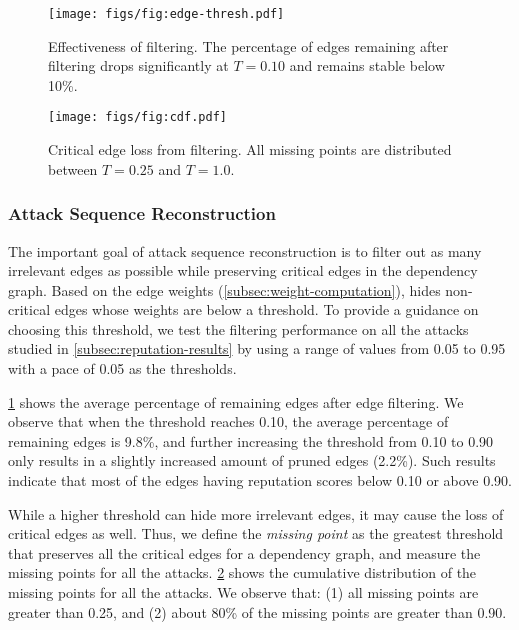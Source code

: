 


% 
\begin{figure}[!ht]
    \centering
    \texttt{[image: figs/fig:edge-thresh.pdf]}
    \caption{Effectiveness of filtering. The percentage of edges remaining after filtering drops significantly at $T = 0.10$ and remains stable below 10\%.}
    \label{fig:edge-thresh}
\end{figure}


\begin{figure}[!ht]
    \centering
    \texttt{[image: figs/fig:cdf.pdf]}
    \caption{Critical edge loss from filtering. All missing points are distributed between $T = 0.25$ and $T = 1.0$.}
    \label{fig:cdf}
\end{figure}


\subsubsection{Attack Sequence Reconstruction}
\label{subsec:graphreduction}


The important goal of attack sequence reconstruction is to filter out as many irrelevant edges as possible while preserving critical edges in the dependency graph.
Based on the edge weights (\cref{subsec:weight-computation}), \tool hides non-critical edges whose weights are below a threshold.
To provide a guidance on choosing this threshold, we test the filtering performance on all the attacks studied in \cref{subsec:reputation-results}
by using a range of values from 0.05 to 0.95 with a pace of 0.05 as the thresholds. 

\cref{fig:edge-thresh} shows the average percentage of remaining edges after edge filtering. We observe that when the threshold reaches 0.10, the average percentage of remaining edges is 9.8\%, and further increasing the threshold from 0.10 to 0.90 only results in a slightly increased amount of pruned edges (2.2\%). Such results indicate that most of the edges having reputation scores below 0.10 or above 0.90. 

While a higher threshold can hide more irrelevant edges, it may cause the loss of critical edges as well.
Thus, we define the \emph{missing point} as the greatest threshold that preserves all the critical edges for a dependency graph, 
and measure the missing points for all the attacks.
\cref{fig:cdf} shows the cumulative distribution of the missing points for all the attacks.
We observe that:
(1) all missing points are greater than 0.25,
and (2) about 80\% of the missing points are greater than 0.90.


